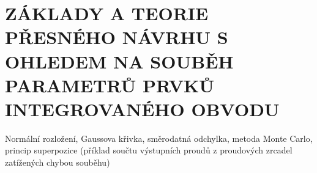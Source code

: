 \section{ZÁKLADY A TEORIE PŘESNÉHO NÁVRHU S OHLEDEM NA SOUBĚH PARAMETRŮ PRVKŮ INTEGROVANÉHO OBVODU}
Normální rozložení, Gaussova křivka, směrodatná odchylka, metoda Monte Carlo, princip superpozice (příklad součtu výstupních proudů z proudových zrcadel zatížených chybou souběhu)
